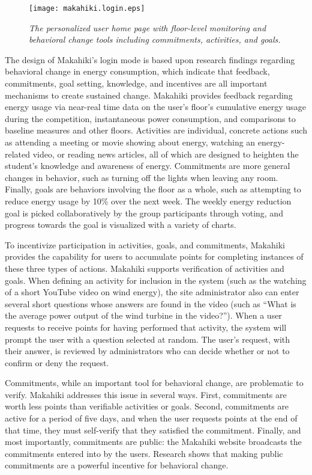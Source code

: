 \begin{figure}[htbp]
  \center
  \texttt{[image: makahiki.login.eps]}
  \caption{\em \small The personalized user home page with floor-level monitoring and behavioral change tools 
including commitments, activities, and goals.}
  \label{fig:makahiki-login}
\end{figure} 

The design of Makahiki's login mode is based upon research findings
regarding behavioral change in energy consumption, which indicate that
feedback, commitments, goal setting, knowledge, and incentives are all
important mechanisms to create sustained change.  Makahiki provides
feedback regarding energy usage via near-real time data on the user's
floor's cumulative energy usage during the competition, instantaneous power
consumption, and comparisons to baseline measures and other
floors. Activities are individual, concrete actions such as attending a
meeting or movie showing about energy, watching an energy-related video, or
reading news articles, all of which are designed to heighten the student's
knowledge and awareness of energy. Commitments are more general changes in
behavior, such as turning off the lights when leaving any room.  Finally,
goals are behaviors involving the floor as a whole, such as attempting to
reduce energy usage by 10\% over the next week. The weekly energy reduction
goal is picked collaboratively by the group participants through voting, and
progress towards the goal is visualized with a variety of charts.

To incentivize participation in activities, goals, and commitments,
Makahiki provides the capability for users to accumulate points for
completing instances of these three types of actions.  Makahiki supports
verification of activities and goals. When defining an activity for
inclusion in the system (such as the watching of a short YouTube video on
wind energy), the site administrator also can enter several short questions
whose answers are found in the video (such as ``What is the average power
output of the wind turbine in the video?'').  When a user requests to
receive points for having performed that activity, the system will prompt
the user with a question selected at random.  The user's request, with
their answer, is reviewed by administrators who can decide whether or not
to confirm or deny the request.  

Commitments, while an important tool for behavioral change, are problematic
to verify.  Makahiki addresses this issue in several ways.  First,
commitments are worth less points than verifiable activities or goals.
Second, commitments are active for a period of five days, and when the user
requests points at the end of that time, they must self-verify that they
satisfied the commitment.  Finally, and most importantly, commitments are
public: the Makahiki website broadcasts the commitments entered into by the
users. Research shows that making public commitments are a powerful incentive
for behavioral change.

